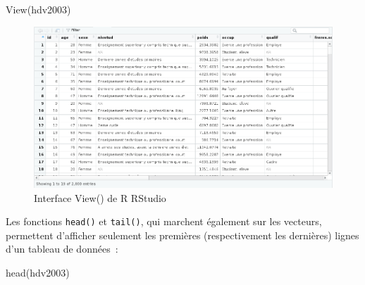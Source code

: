\documentclass[
  letterpaper,
  DIV=11,
  numbers=noendperiod,
  oneside]{scrreprt}
\newenvironment{Shaded}{\begin{snugshade}}{\end{snugshade}}
\newcommand{\FunctionTok}[1]{\textcolor[rgb]{0.28,0.35,0.67}{#1}}
\newcommand{\NormalTok}[1]{\textcolor[rgb]{0.00,0.23,0.31}{#1}}
\begin{document}
\begin{Shaded}
\begin{Highlighting}[]
\FunctionTok{View}\NormalTok{(hdv2003)}
\end{Highlighting}
\end{Shaded}

\begin{figure}

{\centering \includegraphics{bases/ressources/rstudio_view_hdv2003.png}

}

\caption{\label{fig-view}Interface View() de R RStudio}

\end{figure}

Les fonctions \texttt{head()} et \texttt{tail()}, qui marchent également
sur les vecteurs, permettent d'afficher seulement les premières
(respectivement les dernières) lignes d'un tableau de données~:

\begin{Shaded}
\begin{Highlighting}[]
\FunctionTok{head}\NormalTok{(hdv2003)}
\end{Highlighting}
\end{Shaded}
\end{document}
